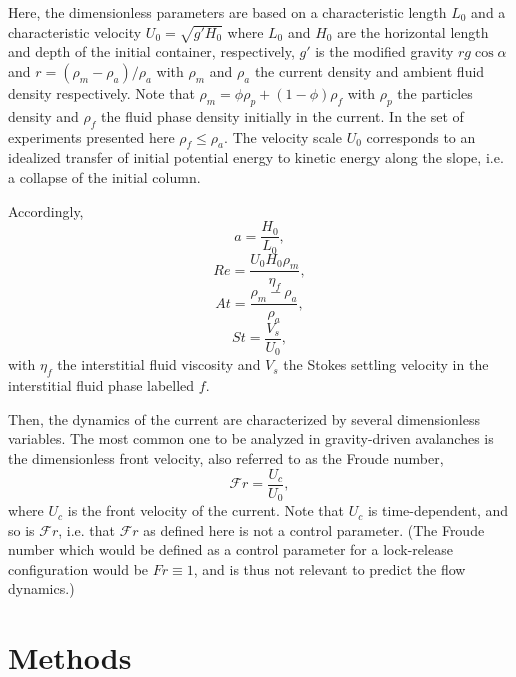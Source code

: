 \documentclass[twocolumn]{article}
\begin{document}
Here, the dimensionless parameters are based on a characteristic length $L_0$ and a characteristic velocity $U_0=\sqrt{g' H_0}$ where $L_0$ and $H_0$ are the horizontal length and depth of the initial container, respectively, $g'$ is the modified gravity $r g \cos{\alpha}$ and $r = (\rho_m - \rho_a)/\rho_a$ with $\rho_m$ and $\rho_a$ the current density and ambient fluid density respectively. Note that $\rho_m = \phi \rho_p+(1-\phi)\rho_f$ with $\rho_p$ the particles density and $\rho_f$ the fluid phase density initially in the current. In the set of experiments presented here $\rho_f\le \rho_a$. The velocity scale $U_0$ corresponds to an idealized transfer of initial potential energy to kinetic energy along the slope, i.e. a collapse of the initial column.


Accordingly,
\begin{equation}
	\displaystyle a =\frac{H_0}{L_0},
\end{equation}
\begin{equation}
	\displaystyle Re = \frac{U_0 H_0\rho_m}{\eta_f},
\end{equation}
\begin{equation}
	\displaystyle At = \frac{\rho_m-\rho_a}{\rho_a},
\end{equation}
\begin{equation}
	\displaystyle St = \frac{V_s}{U_0},
\end{equation}
with $\eta_f$ the interstitial fluid viscosity and $V_s$ the Stokes settling velocity in the interstitial fluid phase labelled $f$.


Then, the dynamics of the current are characterized by several dimensionless variables. The most common one to be analyzed in gravity-driven avalanches is the dimensionless front velocity, also referred to as the Froude number,
\begin{equation}
	\displaystyle \mathcal{F}r =\frac{U_c}{U_0},
\end{equation}
where $U_c$ is the front velocity of the current. Note that $U_c$ is time-dependent, and so is $\mathcal{F}r$, i.e. that $\mathcal{F}r$ as defined here is not a control parameter. (The Froude number which would be defined as a control parameter for a lock-release configuration would be $Fr\equiv 1$, and is thus not relevant to predict the flow dynamics.)

\section{Methods}
\end{document}
